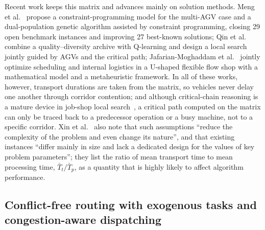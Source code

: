 \documentclass[manuscript,screen,review]{acmart}
\begin{document}
Recent work keeps this matrix and advances mainly on solution methods. Meng et al.~\cite{meng2025cp} propose a constraint-programming model for the multi-AGV case and a dual-population genetic algorithm assisted by constraint programming, closing 29 open benchmark instances and improving 27 best-known solutions; Qin et al.~\cite{qin2026knowledge} combine a quality--diversity archive with Q-learning and design a local search jointly guided by AGVs and the critical path; Jafarian-Moghaddam et al.~\cite{jafarian2026integrated} jointly optimize scheduling and internal logistics in a U-shaped flexible flow shop with a mathematical model and a metaheuristic framework.
In all of these works, however, transport durations are taken from the matrix, so vehicles never delay one another through corridor contention; and although critical-chain reasoning is a mature device in job-shop local search~\cite{otala2021graph,tamssaouet2023neighborhood}, a critical path computed on the matrix can only be traced back to a predecessor operation or a busy machine, not to a specific corridor.
Xin et al.~\cite{xin2025review} also note that such assumptions ``reduce the complexity of the problem and even change its nature'', and that existing instances ``differ mainly in size and lack a dedicated design for the values of key problem parameters''; they list the ratio of mean transport time to mean processing time, $\bar{T}_t/\bar{T}_p$, as a quantity that is highly likely to affect algorithm performance.

\subsection{Conflict-free routing with exogenous tasks and congestion-aware dispatching}
\end{document}
